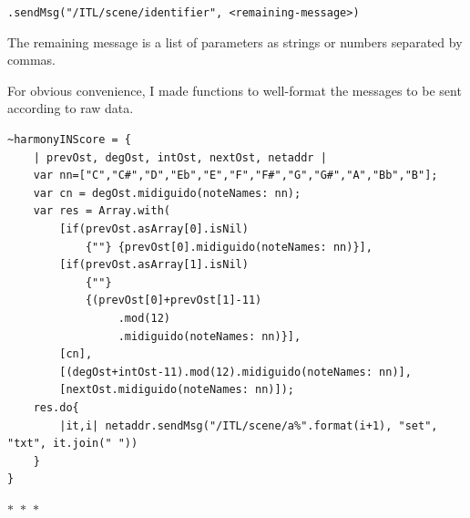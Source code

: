 \documentclass{article}
\begin{document}
\smallskip
\texttt{.sendMsg("/ITL/scene/identifier", <remaining-message>)}
\smallskip

\noindent The remaining message is a list of parameters as strings or numbers separated by commas. 

\vspace{0.25cm}
\setlength{\baselineskip}{10pt}

\setlength{\baselineskip}{12pt}
\vspace{0.25cm}

\noindent For obvious convenience, I made functions to well-format the messages to be sent according to raw data.%
\begin{lstlisting}[style=SuperCollider-IDE]
~harmonyINScore = {
    | prevOst, degOst, intOst, nextOst, netaddr |
    var nn=["C","C#","D","Eb","E","F","F#","G","G#","A","Bb","B"];
    var cn = degOst.midiguido(noteNames: nn);
    var res = Array.with(
        [if(prevOst.asArray[0].isNil)
            {""} {prevOst[0].midiguido(noteNames: nn)}],
        [if(prevOst.asArray[1].isNil)
            {""} 
            {(prevOst[0]+prevOst[1]-11)
                 .mod(12)
                 .midiguido(noteNames: nn)}],
        [cn],
        [(degOst+intOst-11).mod(12).midiguido(noteNames: nn)],
        [nextOst.midiguido(noteNames: nn)]);
    res.do{
        |it,i| netaddr.sendMsg("/ITL/scene/a%".format(i+1), "set", "txt", it.join(" "))
    }
}
\end{lstlisting}

\begin{center}
  $\ast$~$\ast$~$\ast$
\end{center}
\end{document}
